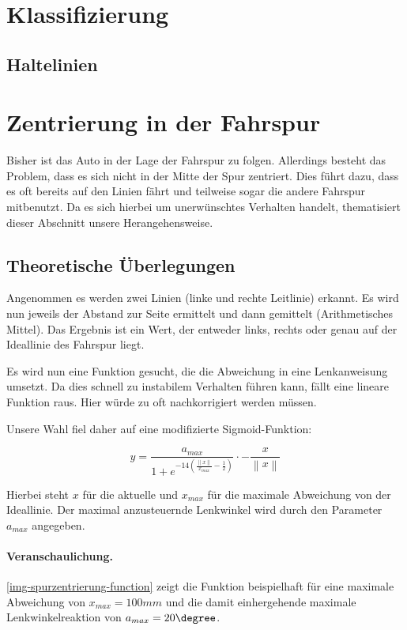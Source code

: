 \documentclass[a4paper,12pt]{report}
\begin{document}
\section{Klassifizierung}

\subsection{Haltelinien}

\section{Zentrierung in der Fahrspur}
	
	Bisher ist das Auto in der Lage der Fahrspur zu folgen.
	Allerdings besteht das Problem, dass es sich nicht in der Mitte der Spur zentriert.
	Dies führt dazu, dass es oft bereits auf den Linien fährt und teilweise sogar die andere Fahrspur mitbenutzt.
	Da es sich hierbei um unerwünschtes Verhalten handelt, thematisiert dieser Abschnitt unsere Herangehensweise.

\subsection{Theoretische Überlegungen}

	Angenommen es werden zwei Linien (linke und rechte Leitlinie) erkannt.
	Es wird nun jeweils der Abstand zur Seite ermittelt und dann gemittelt (Arithmetisches Mittel).
	Das Ergebnis ist ein Wert, der entweder links, rechts oder genau auf der Ideallinie des Fahrspur liegt.
	
	Es wird nun eine Funktion gesucht, die die Abweichung in eine Lenkanweisung umsetzt.
	Da dies schnell zu instabilem Verhalten führen kann, fällt eine lineare Funktion raus.
	Hier würde zu oft nachkorrigiert werden müssen.
	
	Unsere Wahl fiel daher auf eine modifizierte Sigmoid-Funktion:
	
		\[y=\frac{a_{max}}{1 + e^{-14\left( \frac{\left\|x\right\|}{x_{max}} - \frac{1}{2} \right)}} \cdot -\frac{x}{\left\|x\right\|}\]
	
	Hierbei steht $x$ für die aktuelle und $x_{max}$ für die maximale Abweichung von der Ideallinie.
	Der maximal anzusteuernde Lenkwinkel wird durch den Parameter $a_{max}$ angegeben.
	
	\paragraph{Veranschaulichung.} \autoref{img-spurzentrierung-function} zeigt die Funktion beispielhaft für eine maximale Abweichung von $x_{max} = 100mm$ und die damit einhergehende maximale Lenkwinkelreaktion von $a_{max} = 20\degree$.
	
\end{document}
